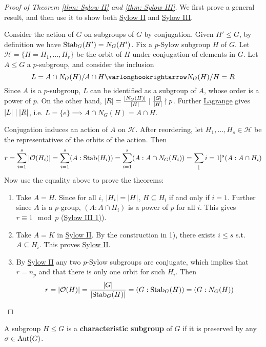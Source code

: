 \documentclass{article}
\begin{document}
\begin{proof}[Proof of Theorem \ref{thm: Sylow II} and \ref{thm: Sylow III}]
    We first prove a general result, and then use it to show both \hyperref[thm: Sylow II]{Sylow II} and \hyperref[thm: Sylow III]{Sylow III}.

    Consider the action of $G$ on subgroups of $G$ by conjugation. Given $H' \leq G$, by definition we have $\mathrm{Stab}_G(H') = N_G(H')$. Fix a $p$-Sylow subgroup $H$ of $G$. Let $\mathcal{H} = \{H = H_1, \dots, H_r\}$ be the orbit of $H$ under conjugation of elements in $G$. Let $A \leq G$ a $p$-subgroup, and consider the inclusion
    \[
        L = A\cap N_G(H)/A \cap H \ext N_G(H)/H = R
    \]
    Since $A$ is a $p$-subgroup, $L$ can be identified as a subgroup of $A$, whose order is a power of $p$. On the other hand, $\left|R\right| = \frac{\left|N_G(H)\right|}{\left|H\right|} \mid \frac{\left|G\right|}{\left|H\right|} \nmid p$. Further \hyperref[thm: Lagrange]{Lagrange} gives $\left|L\right| \mid \left|R\right|$, i.e. $L = \{e\} \implies A \cap N_G(H) = A \cap H$.

    Conjugation induces an action of $A$ on $\mathcal{H}$. After reordering, let $H_1, \dots, H_s \in \mathcal{H}$ be the representatives of the orbits of the action. Then
    \[
        r = \sum_{i = 1}^s \left|\mathcal{O}(H_i)\right| = \sum_{i = 1}^s (A : \mathrm{Stab}(H_i)) = \sum_{i = 1}^s (A : A \cap N_G(H_i)) = \sum_[i = 1]^s (A : A \cap H_i)
    \]
    Now use the equality above to prove the theorems:
    \begin{enumerate}[label=\arabic*)]
        \item Take $A = H$. Since for all $i$, $\left|H_i\right| = \left|H\right|$, $H \subseteq H_i$ if and only if $i = 1$. Further since $A$ is a $p$-group, $(A : A \cap H_i)$ is a power of $p$ for all $i$. This gives $r \equiv 1 \mod{p}$ (\hyperref[thm: Sylow III]{Sylow III 1)}).
        \item Take $A = K$ in \hyperref[thm: Sylow II]{Sylow II}. By the construction in 1), there exists $i \leq s$ s.t. $A \subseteq H_i$. This proves \hyperref[thm: Sylow II]{Sylow II}.
        \item By \hyperref[thm: Sylow II]{Sylow II} any two $p$-Sylow subgroups are conjugate, which implies that $r = n_p$ and that there is only one orbit for such $H_i$. Then
        \[
            r = \left|\mathcal{O}(H)\right| = \frac{\left|G\right|}{\left|\mathrm{Stab}_G(H)\right|} = (G : \mathrm{Stab}_G(H)) = (G : N_G(H))
        \]
    \end{enumerate}
\end{proof}

\begin{definition}
    A subgroup $H \leq G$ is a \textbf{characteristic subgroup} of $G$ if it is preserved by any $\sigma \in \mathrm{Aut}(G)$.
\end{definition}
\end{document}
